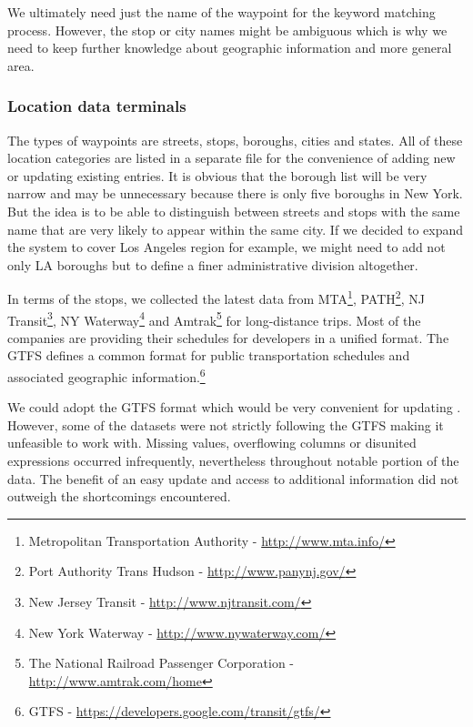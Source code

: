 We ultimately need just the name of the waypoint for the keyword matching process.
However, the stop or city names might be ambiguous which is why we need to keep further knowledge about geographic information and more general area. %

\subsubsection{Location data terminals} \label{sec:terminals}

The types of waypoints are streets, stops, boroughs, cities and states.
All of these location categories are listed in a separate file for the convenience of adding new or updating existing entries.
It is obvious that the borough list will be very narrow and may be unnecessary because there is only five boroughs in New York.
But the idea is to be able to distinguish between streets and stops with the same name that are very likely to appear within the same city.
If we decided to expand the system to cover Los Angeles region for example, we might need to add not only LA boroughs but to define a finer administrative division altogether.

In terms of the stops, we collected the latest data from
MTA\footnote{Metropolitan Transportation Authority - \url{http://www.mta.info/}},
PATH\footnote{Port Authority Trans Hudson - \url{http://www.panynj.gov/}},
NJ Transit\footnote{New Jersey Transit - \url{http://www.njtransit.com/}},
NY Waterway\footnote{New York Waterway - \url{http://www.nywaterway.com/}} and
Amtrak\footnote{The National Railroad Passenger Corporation - \url{http://www.amtrak.com/home}} for long-distance trips.
Most of the companies are providing their schedules for developers in a unified format.
The \acf{GTFS} defines a common format for public transportation schedules and associated geographic information.\footnote{GTFS - \url{https://developers.google.com/transit/gtfs/}}

We could adopt the \ac{GTFS} format which would be very convenient for updating \cite{gtfs}.
However, some of the datasets were not strictly following the \ac{GTFS} making it unfeasible to work with.
Missing values, overflowing columns or disunited expressions occurred infrequently, nevertheless throughout notable portion of the data.
The benefit of an easy update and access to additional information did not outweigh the shortcomings encountered.

